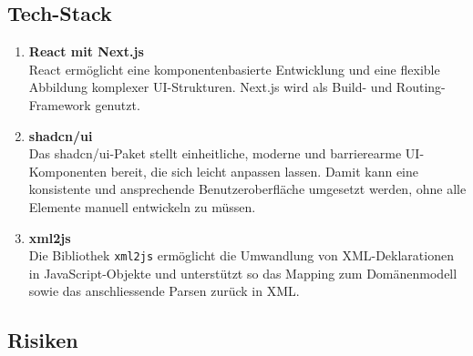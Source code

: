 \documentclass[a4paper,12pt]{article}
\begin{document}
\subsection{Tech-Stack}
\begin{enumerate}
  \item \textbf{React mit Next.js} \\ 
    React ermöglicht eine komponentenbasierte Entwicklung und eine flexible Abbildung komplexer UI-Strukturen. Next.js wird als Build- und Routing-Framework genutzt.

  \item \textbf{shadcn/ui} \\
    Das shadcn/ui-Paket stellt einheitliche, moderne und barrierearme UI-Komponenten bereit, die sich leicht anpassen lassen. Damit kann eine konsistente und ansprechende Benutzeroberfläche umgesetzt werden, ohne alle Elemente manuell entwickeln zu müssen.

  \item \textbf{xml2js} \\
    Die Bibliothek \texttt{xml2js} ermöglicht die Umwandlung von XML-Deklarationen in JavaScript-Objekte und unterstützt so das Mapping zum Domänenmodell sowie das anschliessende Parsen zurück in XML.
\end{enumerate}


\subsection{Risiken}
\renewcommand{\arraystretch}{1.25}
\end{document}
